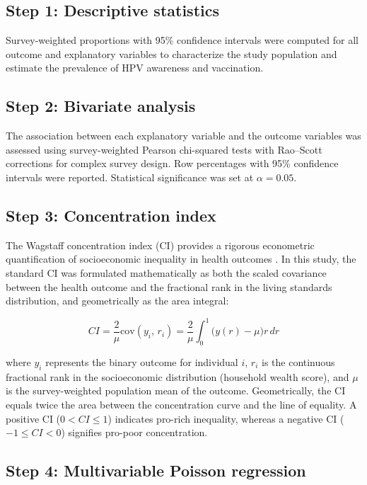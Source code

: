 \subsection{Step 1: Descriptive statistics}

Survey-weighted proportions with 95\% confidence intervals were computed for all outcome and explanatory variables to characterize the study population and estimate the prevalence of HPV awareness and vaccination.

\subsection{Step 2: Bivariate analysis}

The association between each explanatory variable and the outcome variables was assessed using survey-weighted Pearson chi-squared tests with Rao--Scott corrections for complex survey design. Row percentages with 95\% confidence intervals were reported. Statistical significance was set at $\alpha = 0.05$.

\subsection{Step 3: Concentration index}

The Wagstaff concentration index (CI) provides a rigorous econometric quantification of socioeconomic inequality in health outcomes \cite{wagstaff2000}. In this study, the standard CI was formulated mathematically as both the scaled covariance between the health outcome and the fractional rank in the living standards distribution, and geometrically as the area integral:

\begin{equation}
CI = \frac{2}{\mu} \mathrm{cov}(y_i,\, r_i) = \frac{2}{\mu} \int_0^1 \bigl( y(r) - \mu \bigr) r \,dr
\end{equation}

\noindent where $y_i$ represents the binary outcome for individual $i$, $r_i$ is the continuous fractional rank in the socioeconomic distribution (household wealth score), and $\mu$ is the survey-weighted population mean of the outcome. Geometrically, the CI equals twice the area between the concentration curve and the line of equality. A positive CI ($0 < CI \le 1$) indicates pro-rich inequality, whereas a negative CI ($-1 \le CI < 0$) signifies pro-poor concentration.

\subsection{Step 4: Multivariable Poisson regression}

